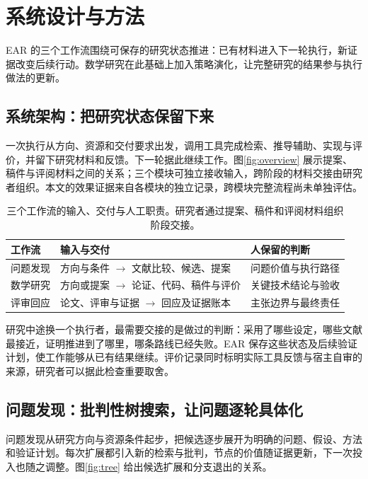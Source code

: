 \FloatBarrier
{}
\section{系统设计与方法}
\label{sec:methods}
EAR 的三个工作流围绕可保存的研究状态推进：已有材料进入下一轮执行，新证据改变后续行动。数学研究在此基础上加入策略演化，让完整研究的结果参与执行做法的更新。

\FloatBarrier
\subsection{系统架构：把研究状态保留下来}
\label{sec:architecture}
一次执行从方向、资源和交付要求出发，调用工具完成检索、推导辅助、实现与评价，并留下研究材料和反馈。下一轮据此继续工作。图\ref{fig:overview} 展示提案、稿件与评阅材料之间的关系；三个模块可独立接收输入，跨阶段的材料交接由研究者组织。本文的效果证据来自各模块的独立记录，跨模块完整流程尚未单独评估。


\begin{table}[H]
\centering\small
\begin{tabularx}{\textwidth}{P{24mm}Y Y}
\toprule
{}
\textbf{工作流} & \textbf{输入与交付} & \textbf{人保留的判断}\\
\midrule
问题发现 & 方向与条件 $\to$ 文献比较、候选、提案 & 问题价值与执行路径\\
数学研究 & 方向或提案 $\to$ 论证、代码、稿件与评价 & 关键技术结论与验收\\
评审回应 & 论文、评审与证据 $\to$ 回应及证据账本 & 主张边界与最终责任\\
\bottomrule
\end{tabularx}
\caption{三个工作流的输入、交付与人工职责。研究者通过提案、稿件和评阅材料组织阶段交接。}
\label{tab:interfaces}
\end{table}

研究中途换一个执行者，最需要交接的是做过的判断：采用了哪些设定，哪些文献最接近，证明推进到了哪里，哪条路线已经失败。EAR 保存这些状态及后续验证计划，使工作能够从已有结果继续。评价记录同时标明实际工具反馈与宿主自审的来源，研究者可以据此检查重要取舍。

\FloatBarrier
\subsection{问题发现：批判性树搜索，让问题逐轮具体化}
\label{sec:idea}
问题发现从研究方向与资源条件起步，把候选逐步展开为明确的问题、假设、方法和验证计划。每次扩展都引入新的检索与批判，节点的价值随证据更新，下一次投入也随之调整。图\ref{fig:tree} 给出候选扩展和分支退出的关系。

